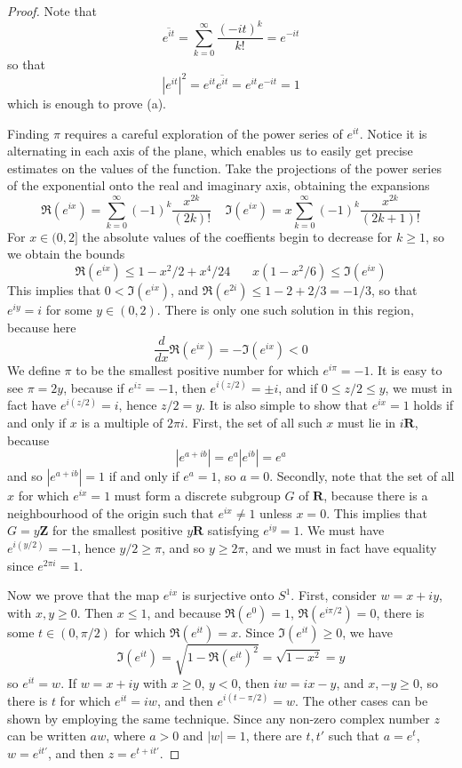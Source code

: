 \begin{proof}
    Note that
    \[ \overline{e^{it}} = \sum_{k = 0}^\infty \frac{(-it)^k}{k!} = e^{-it} \]
    so that
    \[ |e^{it}|^2 = e^{it} \overline{e^{it}} = e^{it} e^{-it} = 1 \]
    which is enough to prove (a).

    Finding $\pi$ requires a careful exploration of the power series of $e^{it}$. Notice it is alternating in each axis of the plane, which enables us to easily get precise estimates on the values of the function. Take the projections of the power series of the exponential onto the real and imaginary axis, obtaining the expansions
%
\[ \Re(e^{ix}) = \sum_{k = 0}^\infty (-1)^k \frac{x^{2k}}{(2k)!}\ \ \ \ \ \Im(e^{ix}) = x \sum_{k = 0}^\infty (-1)^k \frac{x^{2k}}{(2k+1)!} \]
%
For $x \in (0,2]$ the absolute values of the coeffients begin to decrease for $k \geq 1$, so we obtain the bounds
%
\[ \Re(e^{ix}) \leq 1 - x^2/2 + x^4/24\ \ \ \ \ \ \ \ x(1 - x^2/6) \leq \Im(e^{ix}) \]
%
This implies that $0 < \Im(e^{ix})$, and $\Re(e^{2i}) \leq 1 - 2 + 2/3 = -1/3$, so that $e^{iy} = i$ for some $y \in (0,2)$. There is only one such solution in this region, because here
%
\[ \frac{d}{dx} \Re(e^{ix}) = - \Im(e^{ix}) < 0 \]
%
We define $\pi$ to be the smallest positive number for which $e^{i \pi} = -1$. It is easy to see $\pi = 2y$, because if $e^{iz} = -1$, then $e^{i(z/2)} = \pm i$, and if $0 \leq z/2 \leq y$, we must in fact have $e^{i(z/2)} = i$, hence $z/2 = y$. It is also simple to show that $e^{ix} = 1$ holds if and only if $x$ is a multiple of $2 \pi i$. First, the set of all such $x$ must lie in $i \mathbf{R}$, because
%
\[ |e^{a + ib}| = e^a |e^{ib}| = e^a \]
%
and so $|e^{a+ib}| = 1$ if and only if $e^a = 1$, so $a = 0$. Secondly, note that the set of all $x$ for which $e^{ix} = 1$ must form a discrete subgroup $G$ of $\mathbf{R}$, because there is a neighbourhood of the origin such that $e^{ix} \neq 1$ unless $x = 0$. This implies that $G = y \mathbf{Z}$ for the smallest positive $y \mathbf{R}$ satisfying $e^{iy} = 1$. We must have $e^{i(y/2)} = -1$, hence $y/2 \geq \pi$, and so $y \geq 2 \pi$, and we must in fact have equality since $e^{2 \pi i} = 1$.

Now we prove that the map $e^{ix}$ is surjective onto $S^1$. First, consider $w = x + iy$, with $x,y \geq 0$. Then $x \leq 1$, and because $\Re(e^0) = 1$, $\Re(e^{i\pi/2}) = 0$, there is some $t \in (0,\pi/2)$ for which $\Re(e^{it}) = x$. Since $\Im(e^{it}) \geq 0$, we have
%
\[ \Im(e^{it}) = \sqrt{1 - \Re(e^{it})^2} = \sqrt{1 - x^2} = y \]
%
so $e^{it} = w$. If $w = x + iy$ with $x \geq 0$, $y < 0$, then $iw = ix - y$, and $x, -y \geq 0$, so there is $t$ for which $e^{it} = iw$, and then $e^{i(t-\pi/2)} = w$. The other cases can be shown by employing the same technique. Since any non-zero complex number $z$ can be written $aw$, where $a > 0$ and $|w| = 1$, there are $t,t'$ such that $a = e^t$, $w = e^{it'}$, and then $z = e^{t + it'}$.
\end{proof}

